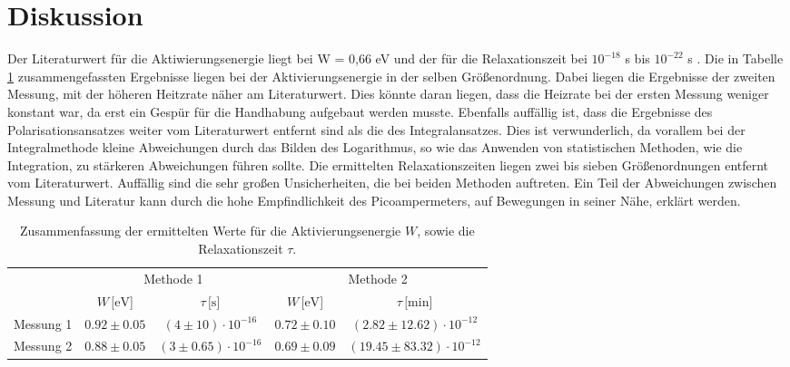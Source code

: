 \newpage
\section{Diskussion}
\label{sec:Diskussion}
Der Literaturwert für die Aktiwierungsenergie liegt bei W = 0,66 eV und der für die Relaxationszeit bei $10^{-18}$ s bis $10^{-22}$ s \cite{muccillo}.
Die in Tabelle \ref{tab:ergebnisse} zusammengefassten Ergebnisse liegen bei der Aktivierungsenergie in der selben Größenordnung.
Dabei liegen die Ergebnisse der zweiten Messung, mit der höheren Heitzrate näher am Literaturwert. 
Dies könnte daran liegen, dass die Heizrate bei der ersten Messung weniger konstant war, da erst ein Gespür für die Handhabung aufgebaut werden musste.
Ebenfalls auffällig ist, dass die Ergebnisse des Polarisationsansatzes weiter vom Literaturwert entfernt sind als die des Integralansatzes.
Dies ist verwunderlich, da vorallem bei der Integralmethode kleine Abweichungen durch das Bilden des Logarithmus, so wie das Anwenden von statistischen Methoden, wie die Integration, zu stärkeren Abweichungen führen sollte.
Die ermittelten Relaxationszeiten liegen zwei bis sieben Größenordnungen entfernt vom Literaturwert.
Auffällig sind die sehr großen Unsicherheiten, die bei beiden Methoden auftreten.
Ein Teil der Abweichungen zwischen Messung und Literatur kann durch die hohe Empfindlichkeit des Picoampermeters, auf Bewegungen in seiner Nähe, erklärt werden.


\begin{table}[h]
    \centering
    \caption{Zusammenfassung der ermittelten Werte für die Aktivierungsenergie $W$, sowie die Relaxationszeit $\tau$.}
    \label{tab:ergebnisse}
    \begin{tabular}{c c c c c}
      \toprule
      &\multicolumn{2}{c}{Methode 1} &\multicolumn{2}{c}{Methode 2}\\
      \cmidrule(lr){2-3}\cmidrule(lr){4-5}
                   &$W \, [\si{\electronvolt}$]  &$\tau \, [\si{\second}$] & $W \, [\si{\electronvolt}$]    & $\tau \, [\si{\minute}$]   \\
      \midrule
      Messung 1    & $0.92 \pm 0.05$              & $(4 \pm 10) \cdot 10^{-16}$    & $0.72 \pm 0.10$                 & $(2.82 \pm 12.62) \cdot 10^{-12}$  \\   
      Messung 2    & $0.88 \pm 0.05$              & $(3 \pm 0.65) \cdot 10^{-16}$  & $0.69 \pm 0.09$                 & $(19.45 \pm 83.32) \cdot 10^{-12}$  \\   
      \bottomrule
    \end{tabular}
  \end{table}
